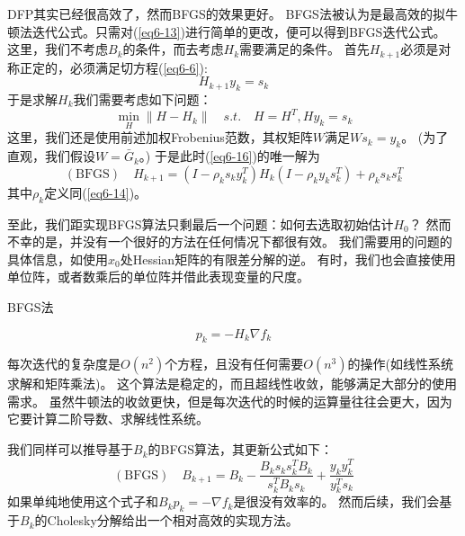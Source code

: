 \documentclass{article}
\begin{document}
DFP其实已经很高效了，然而BFGS的效果更好。
BFGS法被认为是最高效的拟牛顿法迭代公式。只需对(\ref{eq6-13})进行简单的更改，便可以得到BFGS迭代公式。
这里，我们不考虑$B_k$的条件，而去考虑$H_k$需要满足的条件。
首先$H_{k+1}$必须是对称正定的，必须满足切方程(\ref{eq6-6}):
\[
  H_{k+1}y_k = s_k
\]
于是求解$H_k$我们需要考虑如下问题：
\begin{equation}
    \label{eq6-16}
    \min_{H} \|H - H_k\| \quad s.t. \quad H=H^T, Hy_k = s_k
\end{equation}
这里，我们还是使用前述加权Frobenius范数，其权矩阵$W$满足$Ws_k = y_k$。
(为了直观，我们假设$W = \bar{G}_k$。)
于是此时(\ref{eq6-16})的唯一解为
\begin{equation}
  \label{eq6-17}
  (\text{BFGS})\quad
  H_{k+1} = (I - \rho_ks_ky_k^T)H_k(I - \rho_ky_ks_k^T) + \rho_ks_ks_k^T
\end{equation}
其中$\rho_k$定义同(\ref{eq6-14})。

至此，我们距实现BFGS算法只剩最后一个问题：如何去选取初始估计$H_0$？
然而不幸的是，并没有一个很好的方法在任何情况下都很有效。
我们需要用的问题的具体信息，如使用$x_0$处Hessian矩阵的有限差分解的逆。
有时，我们也会直接使用单位阵，或者数乘后的单位阵并借此表现变量的尺度。

\begin{algorithm}
  \caption{BFGS法}
  \label{al6-1}
  \begin{algorithmic}[1]
    \begin{equation}
      \label{eq6-18}
      p_k = -H_k\nabla f_k
    \end{equation}
  \EndWhile
  \end{algorithmic}
\end{algorithm}

每次迭代的复杂度是$O(n^2)$个方程，且没有任何需要$O(n^3)$的操作(如线性系统求解和矩阵乘法)。
这个算法是稳定的，而且超线性收敛，能够满足大部分的使用需求。
虽然牛顿法的收敛更快，但是每次迭代的时候的运算量往往会更大，因为它要计算二阶导数、求解线性系统。

我们同样可以推导基于$B_k$的BFGS算法，其更新公式如下：
\begin{equation}
  \label{eq6-19}
  (\text{BFGS})\quad
  B_{k+1} = B_k - \frac{B_ks_ks_k^TB_k}{s_k^TB_ks_k} + \frac{y_ky_k^T}{y_k^Ts_k}
\end{equation}
如果单纯地使用这个式子和$B_k p_k = -\nabla f_k$是很没有效率的。
然而后续，我们会基于$B_k$的Cholesky分解给出一个相对高效的实现方法。
\end{document}
